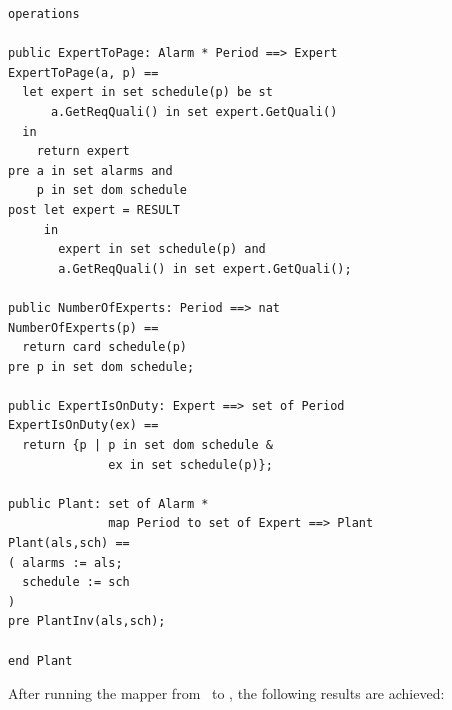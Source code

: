 \begin{description}
\begin{lstlisting}
operations

public ExpertToPage: Alarm * Period ==> Expert
ExpertToPage(a, p) ==
  let expert in set schedule(p) be st
      a.GetReqQuali() in set expert.GetQuali()
  in
    return expert
pre a in set alarms and
    p in set dom schedule
post let expert = RESULT
     in
       expert in set schedule(p) and
       a.GetReqQuali() in set expert.GetQuali();
	 
public NumberOfExperts: Period ==> nat
NumberOfExperts(p) ==
  return card schedule(p)
pre p in set dom schedule;

public ExpertIsOnDuty: Expert ==> set of Period
ExpertIsOnDuty(ex) ==
  return {p | p in set dom schedule & 
              ex in set schedule(p)};

public Plant: set of Alarm * 
              map Period to set of Expert ==> Plant
Plant(als,sch) ==
( alarms := als;
  schedule := sch
)
pre PlantInv(als,sch);

end Plant
\end{lstlisting}
\end{description}

After running the mapper from \vpp\ to \jml, the following results are achieved:

